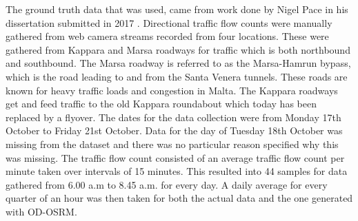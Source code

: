 \documentclass[12pt, a4paper]{report}
\theoremstyle{definition}
\theoremstyle{definition}%
\theoremstyle{definition}%
\theoremstyle{definition}%
\theoremstyle{definition}%
\theoremstyle{definition}%
\begin{document}

The ground truth data that was used, came from work done by Nigel Pace in his dissertation submitted in 2017 \cite{Pace2017}. Directional traffic flow counts were manually gathered from web camera streams recorded from four locations. These were gathered from Kappara and Marsa roadways for traffic which is both northbound and southbound. The Marsa roadway is referred to as the Marsa-Hamrun bypass, which is the road leading to and from the Santa Venera tunnels. These roads are known for heavy traffic loads and congestion in Malta. The Kappara roadways get and feed traffic to the old Kappara roundabout which today has been replaced by a flyover. The dates for the data collection were from Monday 17th October to Friday 21st October. Data for the day of Tuesday 18th October was missing from the dataset and there was no particular reason specified why this was missing. The traffic flow count consisted of an average traffic flow count per minute taken over intervals of 15 minutes. This resulted into 44 samples for data gathered from 6.00 a.m to 8.45 a.m. for every day. A daily average for every quarter of an hour was then taken for both the actual data and the one generated with OD-OSRM.   


\end{document}
